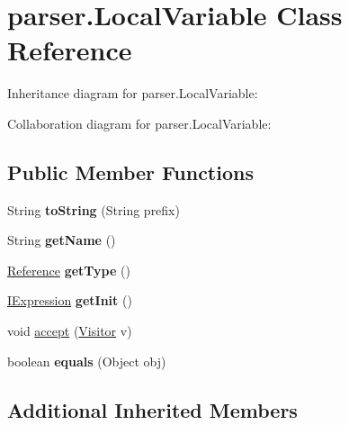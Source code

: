 \hypertarget{classparser_1_1_local_variable}{}\section{parser.\+Local\+Variable Class Reference}
\label{classparser_1_1_local_variable}


Inheritance diagram for parser.\+Local\+Variable\+:


Collaboration diagram for parser.\+Local\+Variable\+:
\subsection*{Public Member Functions}
\begin{DoxyCompactItemize}
\item 
String {\bfseries to\+String} (String prefix)\hypertarget{classparser_1_1_local_variable_ad0888771dfe8c3ab19e88d4164dd2f9e}{}\label{classparser_1_1_local_variable_ad0888771dfe8c3ab19e88d4164dd2f9e}

\item 
String {\bfseries get\+Name} ()\hypertarget{classparser_1_1_local_variable_aa50b5eaa5d11a56606dda347c759e6f4}{}\label{classparser_1_1_local_variable_aa50b5eaa5d11a56606dda347c759e6f4}

\item 
\hyperlink{classparser_1_1_reference}{Reference} {\bfseries get\+Type} ()\hypertarget{classparser_1_1_local_variable_abc6d56875b51b3a4fa040ff791503c12}{}\label{classparser_1_1_local_variable_abc6d56875b51b3a4fa040ff791503c12}

\item 
\hyperlink{interfaceparser_1_1_i_expression}{I\+Expression} {\bfseries get\+Init} ()\hypertarget{classparser_1_1_local_variable_a85e1be3de84d74c1fad19f53dc95c60e}{}\label{classparser_1_1_local_variable_a85e1be3de84d74c1fad19f53dc95c60e}

\item 
void \hyperlink{classparser_1_1_local_variable_a05cc54ad4510f09caca69a3223b641a1}{accept} (\hyperlink{interfacemain_1_1_visitor}{Visitor} v)
\item 
boolean {\bfseries equals} (Object obj)\hypertarget{classparser_1_1_local_variable_a5414385a79ce2b568fb145d0930e1895}{}\label{classparser_1_1_local_variable_a5414385a79ce2b568fb145d0930e1895}

\end{DoxyCompactItemize}
\subsection*{Additional Inherited Members}


